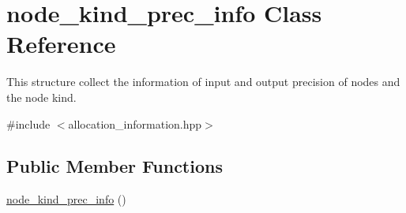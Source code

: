 \hypertarget{structnode__kind__prec__info}{}\section{node\+\_\+kind\+\_\+prec\+\_\+info Class Reference}
\label{structnode__kind__prec__info}


This structure collect the information of input and output precision of nodes and the node kind.  




{\ttfamily \#include $<$allocation\+\_\+information.\+hpp$>$}

\subsection*{Public Member Functions}
\begin{DoxyCompactItemize}
\item 
\hyperlink{structnode__kind__prec__info_a0e501c2bbd263082feda660fe26a983f}{node\+\_\+kind\+\_\+prec\+\_\+info} ()
\end{DoxyCompactItemize}
